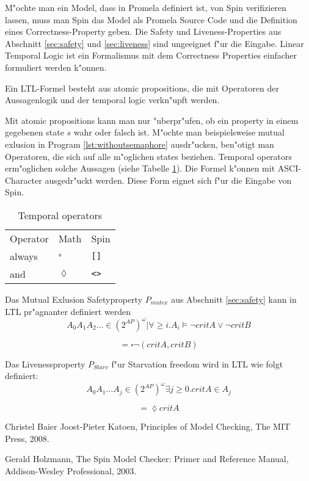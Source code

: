 \documentclass[11pt,twoside,a4paper]{article}
\begin{document}
M"ochte man ein Model, dass in Promela definiert ist, von Spin verifizieren lassen, muss man Spin das Model als Promela Source Code und die Definition eines Correctness-Property geben. Die Safety und Liveness-Properties aus Abschnitt \ref{sec:safety} und \ref{sec:liveness} sind ungeeignet f"ur die Eingabe. Linear Temporal Logic ist ein Formalismus mit dem Correctness Properties einfacher formuliert werden k"onnen.

Ein LTL-Formel besteht aus atomic propositions, die mit Operatoren der Aussagenlogik  und der temporal logic verkn"upft werden.

Mit atomic propositions kann man nur "uberpr"ufen, ob ein property in einem gegebenen state $s$ wahr oder falsch ist. M"ochte man beispielsweise mutual exlusion in Program \ref{lst:withoutsemaphore} ausdr"ucken, ben"otigt man Operatoren, die sich auf alle m"oglichen states beziehen. Temporal operators erm"oglichen solche Aussagen (siehe Tabelle \ref{tab:temporal_operators}). Die Formel k"onnen mit ASCI-Character ausgedr"uckt werden. Diese Form eignet sich f"ur die Eingabe von Spin.

\begin{table}
  \centering
  \begin{tabular}{l l l}
    Operator & Math & Spin \\
    always & $\square$ & \verb|[]| \\
    and & $\lozenge$ & \verb|<>| \\
  \end{tabular}
  \caption{Temporal operators }
  \label{tab:temporal_operators}
\end{table}

Das Mutual Exlusion Safetyproperty $P_{mutex}$ aus Abschnitt \ref{sec:safety} kann in LTL pr"agnanter definiert werden
\[
  {A_0 A_1 A_2 \dots \in (2^{AP})^{\omega} | \forall \geq i.   A_i \models \neg critA \lor \neg critB}
\]

\[
= \square \neg (critA,critB)
\]

Das Livenessproperty $P_{Starv}$ f"ur Starvation freedom wird in LTL wie folgt definiert:
\[
 { A_0 A_1 \dots A_j \in (2^{AP})^{\omega} \exists j \geq 0. critA \in A_j}
\]

\[
= \lozenge critA
\]

\appendix

\begin{thebibliography}{9}
Christel Baier Joost-Pieter Katoen,
Principles of Model Checking,
The MIT Press,
2008.

Gerald Holzmann,
The Spin Model Checker: Primer and Reference Manual,
Addison-Wesley Professional,
2003.
\end{thebibliography}
\end{document}
